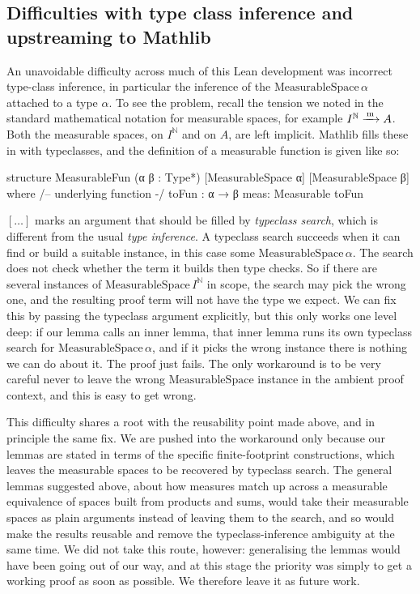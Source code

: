 \subsection{Difficulties with type class inference and upstreaming to Mathlib}

An unavoidable difficulty across much of this Lean development was incorrect type-class inference, in particular the inference of the $\mathrm{MeasurableSpace}\, \alpha$ attached to a type $\alpha$.
To see the problem, recall the tension we noted in the standard mathematical notation for measurable spaces, for example $I^\mathbb{N} \xrightarrow{\,\mathrm{m}\,} A$. Both the measurable spaces, on $I^\mathbb{N}$ and on $A$, are left implicit.
Mathlib fills these in with typeclasses, and the definition of a measurable function is given like so:

\begin{leancode}
structure MeasurableFun (α β : Type*) [MeasurableSpace α] [MeasurableSpace β] where
  /-- underlying function -/
  toFun : α → β
  meas: Measurable toFun
\end{leancode}

$[\ldots]$ marks an argument that should be filled by \emph{typeclass search}, which is different from the usual \emph{type inference}. A typeclass search succeeds when it
can find or build a suitable instance, in this case some $\mathrm{MeasurableSpace}\, \alpha$. The search does not check whether the term it builds then type checks. So if
there are several instances of $\mathrm{MeasurableSpace}\, I^\mathbb{N}$ in scope, the search may pick the wrong one, and the resulting proof term will not have the type we
expect. We can fix this by passing the typeclass argument explicitly, but this only works one level deep: if our lemma calls an inner lemma, that inner lemma runs its own
typeclass search for $\mathrm{MeasurableSpace}\, \alpha$, and if it picks the wrong instance there is nothing we can do about it. The proof just fails. The only workaround
is to be very careful never to leave the wrong $\mathrm{MeasurableSpace}$ instance in the ambient proof context, and this is easy to get wrong.

This difficulty shares a root with the reusability point made above, and in principle the same fix. We are pushed into the workaround only because our lemmas are stated in terms of the
specific finite-footprint constructions, which leaves the measurable spaces to be recovered by typeclass search. The general lemmas suggested above, about how
measures match up across a measurable equivalence of spaces built from products and sums, would take their measurable spaces as plain arguments instead of leaving them to the
search, and so would make the results reusable and remove the typeclass-inference ambiguity at the same time. We did not take this route, however: generalising the lemmas would have been
going out of our way, and at this stage the priority was simply to get a working proof as soon as possible. We therefore leave it as future work.

